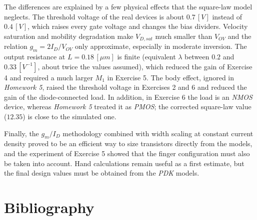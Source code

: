 \documentclass[12pt,a4paper]{article}
\begin{document}
The differences are explained by a few physical effects that the square-law model neglects. The threshold voltage of the real devices is about $0.7 \, [V]$ instead of $0.4 \, [V]$, which raises every gate voltage and changes the bias dividers. Velocity saturation and mobility degradation make $V_{D,sat}$ much smaller than $V_{OV}$ and the relation $g_{m} = 2 I_{D}/V_{OV}$ only approximate, especially in moderate inversion. The output resistance at $L = 0.18 \, [\mu m]$ is finite (equivalent $\lambda$ between $0.2$ and $0.33 \, [V^{-1}]$, about twice the values assumed), which reduced the gain of Exercise 4 and required a much larger $M_{1}$ in Exercise 5. The body effect, ignored in \textit{Homework 5}, raised the threshold voltage in Exercises 2 and 6 and reduced the gain of the diode-connected load. In addition, in Exercise 6 the load is an \textit{NMOS} device, whereas \textit{Homework 5} treated it as \textit{PMOS}; the corrected square-law value ($12.35$) is close to the simulated one.

Finally, the $g_{m}/I_{D}$ methodology combined with width scaling at constant current density proved to be an efficient way to size transistors directly from the models, and the experiment of Exercise 5 showed that the finger configuration must also be taken into account. Hand calculations remain useful as a first estimate, but the final design values must be obtained from the \textit{PDK} models.



\newpage
\section{Bibliography}                                              \label{sec_bib}
\begingroup
    \renewcommand{\section}[2]{}    %
    \raggedright                    %
    
    
\endgroup
\end{document}
